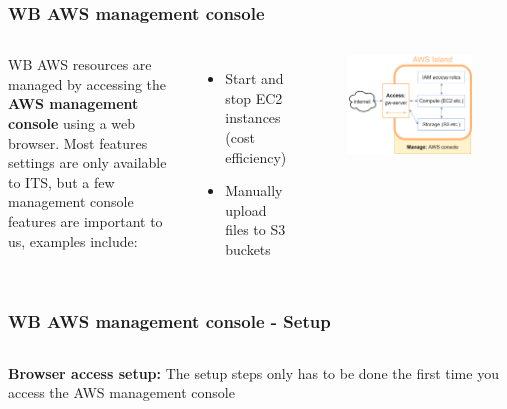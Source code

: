 \documentclass[aspectratio=169]{beamer} %
\begin{document}
\begin{frame}
	\frametitle{WB AWS management console}
	\begin{columns}[c]
		WB AWS resources are managed by accessing the 
		\textbf{AWS management console} using a web browser.
		\vspace{.5cm}\newline
		Most features settings are only available to ITS,
		but a few management console features are important to us,
		examples include:
		\begin{itemize}
			\item Start and stop EC2 instances (cost efficiency)
			\item Manually upload files to S3 buckets
		\end{itemize}

		\begin{figure}
			\centering
			\includegraphics[width=\textwidth]{./img/wb-aws.png}
		\end{figure}

	\end{columns}
\end{frame}

\begin{frame}
	\frametitle{WB AWS management console - Setup}
	\begin{columns}[c]
		
		
		\textbf{Browser access setup:} The setup steps 
		only has to be done the first time you access
		the AWS management console

	\end{columns}
\end{frame}
\end{document}
